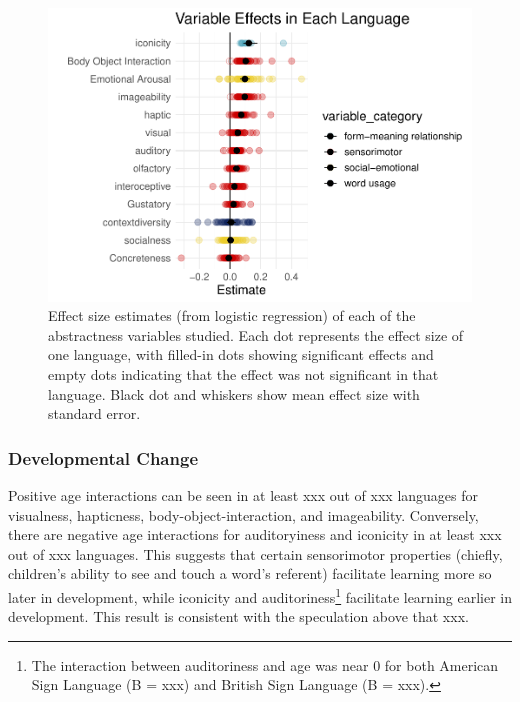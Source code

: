 \documentclass[
  man,floatsintext]{apa6}
\begin{document}
\begin{figure}
\centering
\includegraphics{crossling_abstractness_manuscript_files/figure-latex/summary-of-maineffects-1.pdf}
\caption{\label{fig:summary-of-maineffects}Effect size estimates (from logistic regression) of each of the abstractness variables studied. Each dot represents the effect size of one language, with filled-in dots showing significant effects and empty dots indicating that the effect was not significant in that language. Black dot and whiskers show mean effect size with standard error.}
\end{figure}

\hypertarget{developmental-change}{%
\subsubsection{Developmental Change}\label{developmental-change}}

Positive age interactions can be seen in at least xxx out of xxx languages for visualness, hapticness, body-object-interaction, and imageability. Conversely, there are negative age interactions for auditoryiness and iconicity in at least xxx out of xxx languages. This suggests that certain sensorimotor properties (chiefly, children's ability to see and touch a word's referent) facilitate learning more so later in development, while iconicity and auditoriness\footnote{The interaction between auditoriness and age was near 0 for both American Sign Language (B = xxx) and British Sign Language (B = xxx).} facilitate learning earlier in development. This result is consistent with the speculation above that xxx.
\end{document}
